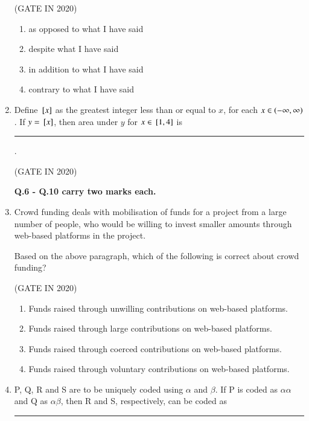 \documentclass[journal,12pt,onecolumn]{IEEEtran}
\theoremstyle{remark}
\begin{document}
\begin{enumerate}
\hfill{(GATE IN 2020)}
\begin{enumerate}
\item as opposed to what I have said
\item despite what I have said
\item in addition to what I have said
\item contrary to what I have said
\end{enumerate}

\item Define ${}\left[x\right]$ as the greatest integer less than or equal to $x$, for each $x \in \left(-\infty, \infty\right)$. If $y = {}\left[x\right]$, then area under $y$ for $x \in {}\left[1,4\right]$ is \rule{2cm}{0.4pt}.

\hfill{(GATE IN 2020)}
\begin{enumerate}
\end{enumerate}

\textbf{Q.6 - Q.10 carry two marks each.}

\item Crowd funding deals with mobilisation of funds for a project from a large number of people, who would be willing to invest smaller amounts through web-based platforms in the project.
\par Based on the above paragraph, which of the following is correct about crowd funding?

\hfill{(GATE IN 2020)}
\begin{enumerate}
\item Funds raised through unwilling contributions on web-based platforms.
\item Funds raised through large contributions on web-based platforms.
\item Funds raised through coerced contributions on web-based platforms.
\item Funds raised through voluntary contributions on web-based platforms.
\end{enumerate}

\item P, Q, R and S are to be uniquely coded using $\alpha$ and $\beta$. If P is coded as $\alpha\alpha$ and Q as $\alpha\beta$, then R and S, respectively, can be coded as \rule{2cm}{0.4pt}


\end{enumerate}
\end{document}
